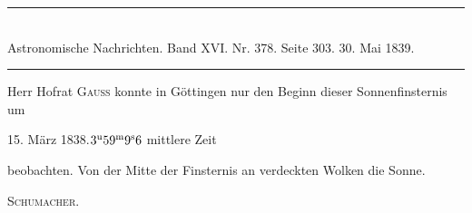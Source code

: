 \clearpage
{}
\begin{center}
\rule{0.55\linewidth}{0.4pt}\\[2pt]
Astronomische Nachrichten. Band XVI. Nr. 378. Seite 303. 30. Mai 1839.\\[2pt]
\rule{0.55\linewidth}{0.4pt}
\end{center}

Herr Hofrat \textsc{Gauss} konnte in Göttingen nur den Beginn dieser Sonnenfinsternis um
\begin{center}15. März 1838.\quad $3^{\rm u}59^{\rm m}9^{\rm s}6$ mittlere Zeit\end{center}
\noindent beobachten. Von der Mitte der Finsternis an verdeckten Wolken die Sonne.
\begin{flushright}\textsc{Schumacher.}\end{flushright}

